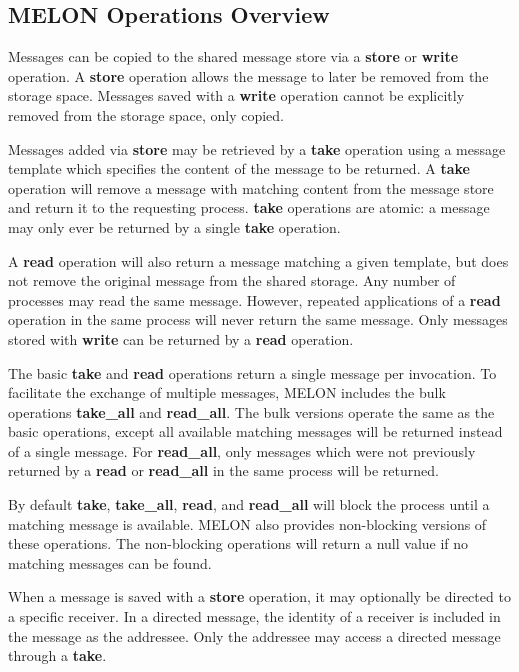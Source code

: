 \documentclass{llncs}
\begin{document}
\subsection{MELON Operations Overview}

Messages can be copied to the shared message store via a \textbf{store} or \textbf{write} operation. A \textbf{store} operation allows the message to later be removed from the storage space. Messages saved with a \textbf{write} operation cannot be explicitly removed from the storage space, only copied.

Messages added via \textbf{store} may be retrieved by a \textbf{take} operation using a message template which specifies the content of the message to be returned. A \textbf{take} operation will remove a message with matching content from the message store and return it to the requesting process. \textbf{take} operations are atomic: a message may only ever be returned by a single \textbf{take} operation.

A \textbf{read} operation will also return a message matching a given template, but does not remove the original message from the shared storage. Any number of processes may read the same message. However, repeated applications of a \textbf{read} operation in the same process will never return the same message. Only messages stored with \textbf{write} can be returned by a \textbf{read} operation.

The basic \textbf{take} and \textbf{read} operations return a single message per invocation. To facilitate the exchange of multiple messages, MELON includes the bulk operations \textbf{take\_all} and \textbf{read\_all}. The bulk versions operate the same as the basic operations, except all available matching messages will be returned instead of a single message. For \textbf{read\_all}, only messages which were not previously returned by a \textbf{read} or \textbf{read\_all} in the same process will be returned.

By default \textbf{take}, \textbf{take\_all}, \textbf{read}, and \textbf{read\_all} will block the process until a matching message is available. MELON also provides non-blocking versions of these operations. The non-blocking operations will return a null value if no matching messages can be found.

When a message is saved with a \textbf{store} operation, it may optionally be directed to a specific receiver. In a directed message, the identity of a receiver is included in the message as the addressee. Only the addressee may access a directed message through a \textbf{take}.
\end{document}
